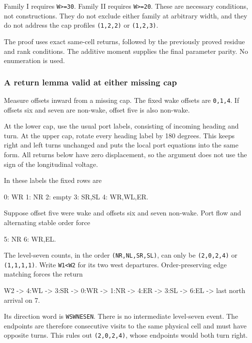 \documentclass[11pt,letterpaper]{article}
\theoremstyle{plain}
\theoremstyle{definition}
\begin{document}
\begin{NoHyper}
Family I requires \texttt{W\textgreater{}=30}. Family II requires \texttt{W\textgreater{}=20}. These are necessary conditions, not constructions. They do not exclude either family at arbitrary width, and they do not address the cap profiles \texttt{(1,2,2)} or \texttt{(1,2,3)}.

The proof uses exact same-cell returns, followed by the previously proved residue and rank conditions. The additive moment supplies the final parameter parity. No enumeration is used.

\subsubsection{A return lemma valid at either missing cap}

Measure offsets inward from a missing cap. The fixed wake offsets are \texttt{0,1,4}. If offsets six and seven are non-wake, offset five is also non-wake.

At the lower cap, use the usual port labels, consisting of incoming heading and turn. At the upper cap, rotate every heading label by 180 degrees. This keeps right and left turns unchanged and puts the local port equations into the same form. All returns below have zero displacement, so the argument does not use the sign of the longitudinal voltage.

In these labels the fixed rows are

\begin{codeblock}
0: WR
1: NR
2: empty
3: SR,SL
4: WR,WL,ER.
\end{codeblock}

Suppose offset five were wake and offsets six and seven non-wake. Port flow and alternating stable order force

\begin{codeblock}
5: NR
6: WR,EL.
\end{codeblock}

The level-seven counts, in the order \texttt{(NR,NL,SR,SL)}, can only be \texttt{(2,0,2,4)} or \texttt{(1,1,1,1)}. Write \texttt{W1\textless{}W2} for its two west departures. Order-preserving edge matching forces the return

\begin{codeblock}
W2 -> 4:WL -> 3:SR -> 0:WR -> 1:NR
   -> 4:ER -> 3:SL -> 6:EL -> last north arrival on 7.
\end{codeblock}

Its direction word is \texttt{WSWNESEN}. There is no intermediate level-seven event. The endpoints are therefore consecutive visits to the same physical cell and must have opposite turns. This rules out \texttt{(2,0,2,4)}, whose endpoints would both turn right.


\end{NoHyper}
\end{document}
